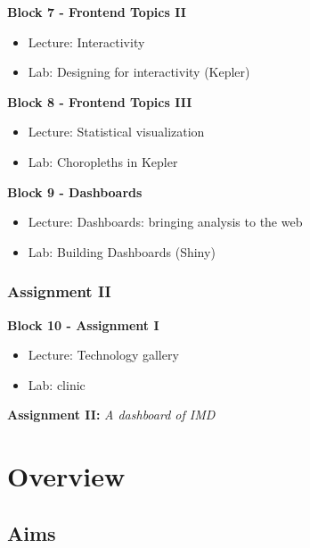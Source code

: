\documentclass[
  letterpaper,
  DIV=11,
  numbers=noendperiod]{scrreprt}
\begin{document}
\textbf{Block 7 - Frontend Topics II}

\begin{itemize}
\item
  Lecture: Interactivity
\item
  Lab: Designing for interactivity (Kepler)
\end{itemize}

\textbf{Block 8 - Frontend Topics III}

\begin{itemize}
\item
  Lecture: Statistical visualization
\item
  Lab: Choropleths in Kepler
\end{itemize}

\textbf{Block 9 - Dashboards}

\begin{itemize}
\item
  Lecture: Dashboards: bringing analysis to the web
\item
  Lab: Building Dashboards (Shiny)
\end{itemize}

\hypertarget{assignment-ii}{%
\subsection*{Assignment II}\label{assignment-ii}}

\textbf{Block 10 - Assignment I}

\begin{itemize}
\item
  Lecture: Technology gallery
\item
  Lab: clinic
\end{itemize}

\textbf{Assignment II:} \emph{A dashboard of IMD}


\hypertarget{overview}{%
\chapter*{Overview}\label{overview}}


\hypertarget{aims}{%
\section*{Aims}\label{aims}}
\end{document}
